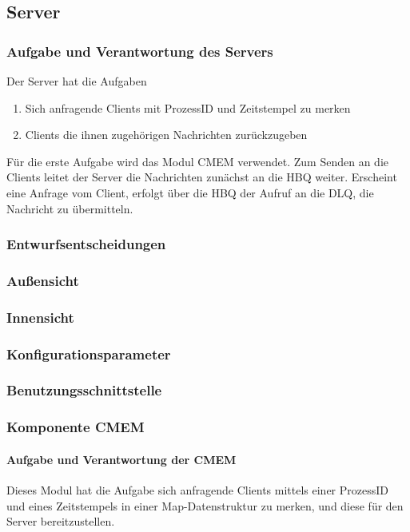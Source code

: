 \documentclass{article}
\begin{document}
	\subsection{Server}
	
		\subsubsection{Aufgabe und Verantwortung des Servers}
			Der Server hat die Aufgaben  
			\begin{enumerate}
    			\item{Sich anfragende Clients mit ProzessID und Zeitstempel zu merken}
    			\item{Clients die ihnen zugehörigen Nachrichten zurückzugeben}
			\end{enumerate}
			Für die erste Aufgabe wird das Modul CMEM verwendet. 
			Zum Senden an die Clients leitet der Server die Nachrichten zunächst an die HBQ weiter. 
			Erscheint eine Anfrage vom Client, erfolgt über die HBQ der Aufruf an die DLQ, 
			die Nachricht zu übermitteln.
		\subsubsection{Entwurfsentscheidungen}
		\subsubsection{Außensicht}
		\subsubsection{Innensicht}
		\subsubsection{Konfigurationsparameter}
		\subsubsection{Benutzungsschnittstelle}
		
		\subsubsection{Komponente CMEM}
			\paragraph{Aufgabe und Verantwortung der CMEM}
				Dieses Modul hat die Aufgabe sich anfragende Clients mittels einer ProzessID und eines Zeitstempels in einer Map-Datenstruktur zu merken, und diese für den Server bereitzustellen.
\end{document}
